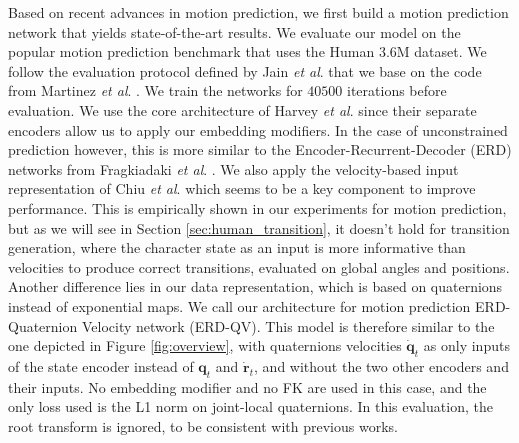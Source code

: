 \documentclass[acmtog]{acmart}
\newcommand{\bq}{\textbf{q}}
\newcommand{\br}{\textbf{r}}
\newcommand{\etal}{\textit{et al}. }
\begin{document}
Based on recent advances in motion prediction, we first build a motion prediction network that yields state-of-the-art results. We evaluate our model on the popular motion prediction benchmark that uses the Human 3.6M dataset. We follow the evaluation protocol defined by Jain \etal {} that we base on the code from Martinez \etal {}. We train the networks for $\num{40500}$ iterations before evaluation. We use the core architecture of Harvey \etal {} since their separate encoders allow us to apply our embedding modifiers. In the case of unconstrained prediction however, this is more similar to the Encoder-Recurrent-Decoder (ERD) networks from Fragkiadaki \etal {}. We also apply the velocity-based input representation of Chiu \etal {} which seems to be a key component to improve performance. This is empirically shown in our experiments for motion prediction, but as we will see in Section \ref{sec:human_transition}, it doesn't hold for transition generation, where the character state as an input is more informative than velocities to produce correct transitions, evaluated on global angles and positions. 
Another difference lies in our data representation, which is based on quaternions instead of exponential maps. 
We call our architecture for motion prediction ERD-Quaternion Velocity network (ERD-QV). This model is therefore similar to the one depicted in Figure \ref{fig:overview}, with quaternions velocities $\dot{\bq}_t$ as only inputs of the state encoder instead of $\bq_t$ and $\dot{\br}_t$, and without the two other encoders and their inputs. No embedding modifier and no FK are used in this case, and the only loss used is the L1 norm on joint-local quaternions. In this evaluation, the root transform is ignored, to be consistent with previous works.
\end{document}
